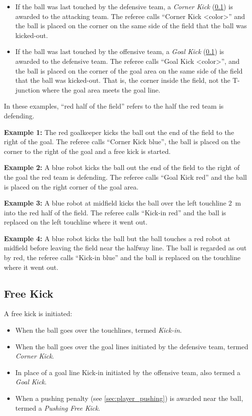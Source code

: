 \begin{itemize}
  \item If the ball was last touched by the defensive team, a \emph{Corner Kick} (\cf \cref{sec:free_kick}) is awarded to the attacking team.
    The referee calls ``Corner Kick \textless color\textgreater'' and the ball is placed on the corner on the same side of the field that the ball was kicked-out.
  \item If the ball was last touched by the offensive team, a \emph{Goal Kick} (\cf \cref{sec:free_kick}) is awarded to the defensive team.
    The referee calls ``Goal Kick \textless color\textgreater'', and the ball is placed on the corner of the goal area on the same side of the field that the ball was kicked-out.
    That is, the corner inside the field, not the T-junction where the goal area meets the goal line.
\end{itemize}

In these examples, ``red half of the field'' refers to the half the red team is defending.

\textbf{Example 1:} The red goalkeeper kicks the ball out the end of the field to the right of the goal.
The referee calls ``Corner Kick blue'', the ball is placed on the corner to the right of the goal and a free kick is started.

\textbf{Example 2:} A blue robot kicks the ball out the end of the field to the right of the goal the red team is defending.
The referee calls ``Goal Kick red'' and the ball is placed on the right corner of the goal area.

\textbf{Example 3:} A blue robot at midfield kicks the ball over the left touchline \qty{2}{\metre} into the red half of the field.
The referee calls ``Kick-in red'' and the ball is replaced on the left touchline where it went out.

\textbf{Example 4:} A blue robot kicks the ball but the ball touches a red robot at midfield before leaving the field near the halfway line.
The ball is regarded as out by red, the referee calls ``Kick-in blue'' and the ball is replaced on the touchline where it went out.

\subsection{Free Kick}
\label{sec:free_kick}

A free kick is initiated:
\begin{itemize}
  \item When the ball goes over the touchlines, termed \emph{Kick-in}.
  \item When the ball goes over the goal lines initiated by the defensive team, termed \emph{Corner Kick}.
  \item In place of a goal line Kick-in initiated by the offensive team, also termed a \emph{Goal Kick}.
  \item When a pushing penalty (see \cref{sec:player_pushing}) is awarded near the ball, termed a \emph{Pushing Free Kick}.
\end{itemize}

